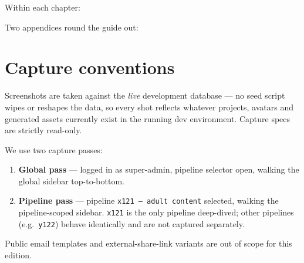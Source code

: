 Within each chapter:

\begin{itemize}
\end{itemize}

Two appendices round the guide out:

\begin{itemize}
\end{itemize}

\section{Capture conventions}
\label{sec:intro-capture}

Screenshots are taken against the \emph{live} development database — no seed
script wipes or reshapes the data, so every shot reflects whatever projects,
avatars and generated assets currently exist in the running dev environment.
Capture specs are strictly read-only.

We use two capture passes:

\begin{enumerate}
  \item \textbf{Global pass} — logged in as super-admin, pipeline selector open, walking the global sidebar top-to-bottom.
  \item \textbf{Pipeline pass} — pipeline \texttt{x121 — adult content} selected, walking the pipeline-scoped sidebar. \texttt{x121} is the only pipeline deep-dived; other pipelines (e.g.\ \texttt{y122}) behave identically and are not captured separately.
\end{enumerate}

Public email templates and external-share-link variants are out of scope for
this edition.

